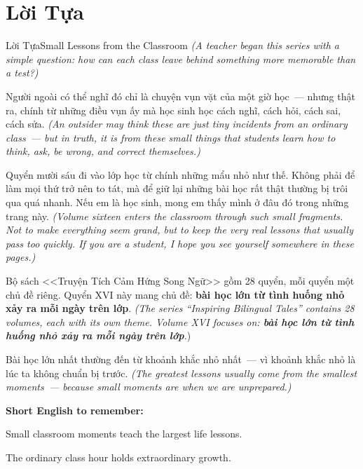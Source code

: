 \chapter*{Lời Tựa}

\begin{truyen}{Lời Tựa}{Small Lessons from the Classroom}
\textit{(A teacher began this series with a simple question: how can each class leave behind something more memorable than a test?)}

Người ngoài có thể nghĩ đó chỉ là chuyện vụn vặt của một giờ học~--- nhưng thật ra, chính từ những điều vụn ấy mà học sinh học cách nghĩ, cách hỏi, cách sai, cách sửa.
\textit{(An outsider may think these are just tiny incidents from an ordinary class~--- but in truth, it is from these small things that students learn how to think, ask, be wrong, and correct themselves.)}

Quyển mười sáu đi vào lớp học từ chính những mẩu nhỏ như thế. Không phải để làm mọi thứ trở nên to tát, mà để giữ lại những bài học rất thật thường bị trôi qua quá nhanh. Nếu em là học sinh, mong em thấy mình ở đâu đó trong những trang này.
\textit{(Volume sixteen enters the classroom through such small fragments. Not to make everything seem grand, but to keep the very real lessons that usually pass too quickly. If you are a student, I hope you see yourself somewhere in these pages.)}

Bộ sách <<Truyện Tích Cảm Hứng Song Ngữ>> gồm 28 quyển, mỗi quyển một chủ đề riêng. Quyển XVI này mang chủ đề: \textbf{bài học lớn từ tình huống nhỏ xảy ra mỗi ngày trên lớp}.
\textit{(The series ``Inspiring Bilingual Tales'' contains 28 volumes, each with its own theme. Volume XVI focuses on: \textbf{bài học lớn từ tình huống nhỏ xảy ra mỗi ngày trên lớp}.})
\end{truyen}

\begin{baihoc}
Bài học lớn nhất thường đến từ khoảnh khắc nhỏ nhất~--- vì khoảnh khắc nhỏ là lúc ta không chuẩn bị trước.
\textit{(The greatest lessons usually come from the smallest moments~--- because small moments are when we are unprepared.)}
\end{baihoc}

\begin{ghinhoanh}
\textbf{Short English to remember:}

Small classroom moments teach the largest life lessons.

The ordinary class hour holds extraordinary growth.
\end{ghinhoanh}


